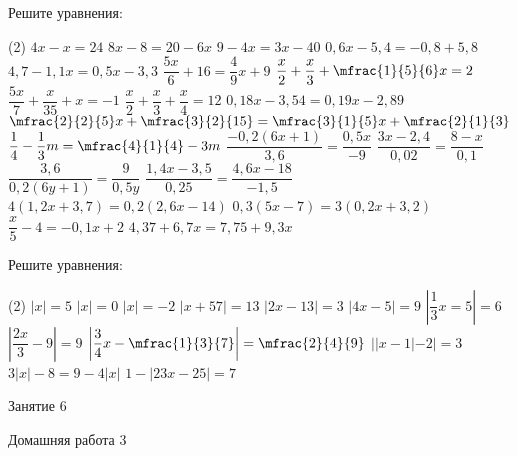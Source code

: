 \begin{class}[number=5]
	\begin{listofex}
		\item Решите уравнения: %
		\begin{tasks}(2)
			\task \( 4x-x=24 \)
			\task \( 8x-8=20-6x \)
			\task \( 9-4x=3x-40 \)
			\task \( 0,6x-5,4=-0,8+5,8 \)
			\task \( 4,7-1,1x=0,5x-3,3 \)
			\task \( \dfrac{5x}{6}+16=\dfrac{4}{9}x+9 \)
			\task \( \dfrac{x}{2}+\dfrac{x}{3}+\mfrac{1}{5}{6}x=2 \)
			\task \( \dfrac{5x}{7}+\dfrac{x}{35}+x=-1 \)
			\task \( \dfrac{x}{2}+\dfrac{x}{3}+\dfrac{x}{4}=12 \)
			\task \( 0,18x-3,54=0,19x-2,89 \)
			\task \( \mfrac{2}{2}{5}x+ \mfrac{3}{2}{15}=\mfrac{3}{1}{5}x + \mfrac{2}{1}{3} \)
			\task \( \dfrac{1}{4} - \dfrac{1}{3}m=\mfrac{4}{1}{4}-3m \)
			\task \( \dfrac{-0,2(6x+1)}{3,6}=\dfrac{0,5x}{-9} \)
			\task \( \dfrac{3x-2,4}{0,02}=\dfrac{8-x}{0,1} \)
			\task \( \dfrac{3,6}{0,2(6y+1)}=\dfrac{9}{0,5y} \)
			\task \( \dfrac{1,4x-3,5}{0,25}=\dfrac{4,6x-18}{-1,5} \)
			\task \( 4(1,2x+3,7)=0,2(2,6x-14) \)
			\task \( 0,3(5x-7)=3(0,2x+3,2) \)
			\task \( \dfrac{x}{5}-4=-0,1x+2 \)
			\task \( 4,37+6,7x=7,75+9,3x \)
		\end{tasks}
		\item Решите уравнения: %
		\begin{tasks}(2)
			\task \( |x|=5 \)
			\task \( |x|=0 \)
			\task \( |x|=-2 \)
			\task \( |x+57|=13 \)
			\task \( |2x-13|=3 \)
			\task \( |4x-5|=9 \)
			\task \( \left| \dfrac{1}{3}x=5 \right|=6 \)
			\task \( \left| \dfrac{2x}{3}-9 \right|=9 \)
			\task \( \left| \dfrac{3}{4}x-\mfrac{1}{3}{7} \right|=\mfrac{2}{4}{9} \)
			\task \( ||x-1|-2|=3 \)
			\task \( 3|x|-8=9-4|x| \)
			\task \( 1-|23x-25|=7 \)
		\end{tasks}
		
	\end{listofex}
\end{class}

\begin{class}[number=6]
	\begin{listofex}
		\item Занятие 6
	\end{listofex}
\end{class}

\begin{homework}[number=3]
	\begin{listofex}
		\item Домашняя работа 3
	\end{listofex}
\end{homework}

